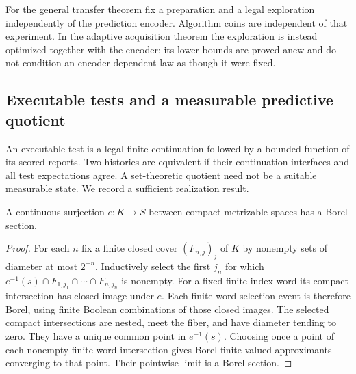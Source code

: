 For the general transfer theorem fix a preparation and a legal exploration independently of the prediction encoder. Algorithm coins are independent of that experiment. In the adaptive acquisition theorem the exploration is instead optimized together with the encoder; its lower bounds are proved anew and do not condition an encoder-dependent law as though it were fixed.

\subsection{Executable tests and a measurable predictive quotient}
An executable test is a legal finite continuation followed by a bounded function of its scored reports. Two histories are equivalent if their continuation interfaces and all test expectations agree. A set-theoretic quotient need not be a suitable measurable state. We record a sufficient realization result.

\begin{lemma}\label{lem:selector}
A continuous surjection $e:K\to S$ between compact metrizable spaces has a Borel section.
\end{lemma}
\begin{proof}
For each $n$ fix a finite closed cover $(F_{n,j})_j$ of $K$ by nonempty sets of diameter at most $2^{-n}$. Inductively select the first $j_n$ for which $e^{-1}(s)\cap F_{1,j_1}\cap\cdots\cap F_{n,j_n}$ is nonempty. For a fixed finite index word its compact intersection has closed image under $e$. Each finite-word selection event is therefore Borel, using finite Boolean combinations of those closed images. The selected compact intersections are nested, meet the fiber, and have diameter tending to zero. They have a unique common point in $e^{-1}(s)$. Choosing once a point of each nonempty finite-word intersection gives Borel finite-valued approximants converging to that point. Their pointwise limit is a Borel section.
\end{proof}

